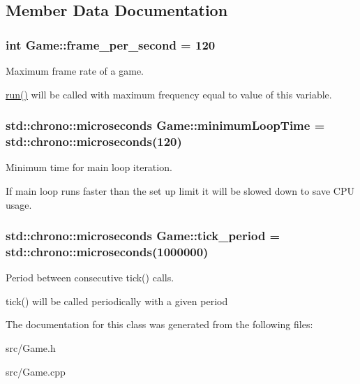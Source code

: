 \subsection{Member Data Documentation}
\hypertarget{classGame_ac57ebbcb3e9f6add9b4bf066c900c0db}{
\subsubsection[{frame\-\_\-per\-\_\-second}]{\setlength{\rightskip}{0pt plus 5cm}int Game\-::frame\-\_\-per\-\_\-second = 120}}\label{classGame_ac57ebbcb3e9f6add9b4bf066c900c0db}


Maximum frame rate of a game. 

\hyperlink{classGame_a1ab78f5ed0d5ea879157357cf2fb2afa}{run()} will be called with maximum frequency equal to value of this variable. \hypertarget{classGame_af9f24863bbe8102d1bf5d97aaa449d14}{
\subsubsection[{minimum\-Loop\-Time}]{\setlength{\rightskip}{0pt plus 5cm}std\-::chrono\-::microseconds Game\-::minimum\-Loop\-Time = std\-::chrono\-::microseconds(120)}}\label{classGame_af9f24863bbe8102d1bf5d97aaa449d14}


Minimum time for main loop iteration. 

If main loop runs faster than the set up limit it will be slowed down to save C\-P\-U usage. \hypertarget{classGame_a65800b8c8afee406d719b404a4a78877}{
\subsubsection[{tick\-\_\-period}]{\setlength{\rightskip}{0pt plus 5cm}std\-::chrono\-::microseconds Game\-::tick\-\_\-period = std\-::chrono\-::microseconds(1000000)}}\label{classGame_a65800b8c8afee406d719b404a4a78877}


Period between consecutive tick() calls. 

tick() will be called periodically with a given period 

The documentation for this class was generated from the following files\-:\begin{DoxyCompactItemize}
\item 
src/Game.\-h\item 
src/Game.\-cpp\end{DoxyCompactItemize}
